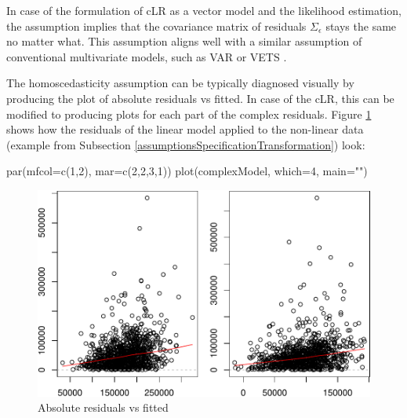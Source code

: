 \documentclass[
]{book}
\newenvironment{Shaded}{\begin{snugshade}}{\end{snugshade}}
\newcommand{\AttributeTok}[1]{\textcolor[rgb]{0.77,0.63,0.00}{#1}}
\newcommand{\DecValTok}[1]{\textcolor[rgb]{0.00,0.00,0.81}{#1}}
\newcommand{\FunctionTok}[1]{\textcolor[rgb]{0.00,0.00,0.00}{#1}}
\newcommand{\NormalTok}[1]{#1}
\newcommand{\StringTok}[1]{\textcolor[rgb]{0.31,0.60,0.02}{#1}}
\begin{document}
In case of the formulation of cLR as a vector model and the likelihood estimation, the assumption implies that the covariance matrix of residuals \(\Sigma_\epsilon\) stays the same no matter what. This assumption aligns well with a similar assumption of conventional multivariate models, such as VAR \citep{Lutkepohl} or VETS \citep{SvetunkovVETS}.

The homoscedasticity assumption can be typically diagnosed visually by producing the plot of absolute residuals vs fitted. In case of the cLR, this can be modified to producing plots for each part of the complex residuals. Figure \ref{fig:heteroDiagnostics} shows how the residuals of the linear model applied to the non-linear data (example from Subsection \ref{assumptionsSpecificationTransformation}) look:

\begin{Shaded}
\begin{Highlighting}[]
\FunctionTok{par}\NormalTok{(}\AttributeTok{mfcol=}\FunctionTok{c}\NormalTok{(}\DecValTok{1}\NormalTok{,}\DecValTok{2}\NormalTok{), }\AttributeTok{mar=}\FunctionTok{c}\NormalTok{(}\DecValTok{2}\NormalTok{,}\DecValTok{2}\NormalTok{,}\DecValTok{3}\NormalTok{,}\DecValTok{1}\NormalTok{))}
\FunctionTok{plot}\NormalTok{(complexModel, }\AttributeTok{which=}\DecValTok{4}\NormalTok{, }\AttributeTok{main=}\StringTok{""}\NormalTok{)}
\end{Highlighting}
\end{Shaded}

\begin{figure}
\centering
\includegraphics{Svetunkov---Svetunkov---Complex-Valued-Econometrics_files/figure-latex/heteroDiagnostics-1.pdf}
\caption{\label{fig:heteroDiagnostics}Absolute residuals vs fitted}
\end{figure}
\end{document}
